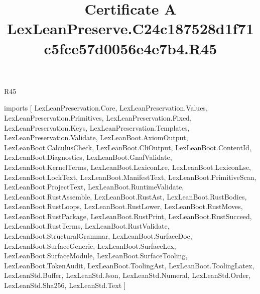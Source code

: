\begin{lexlean}{R45}
\title{Certificate A LexLeanPreserve.C24c187528d1f71c5fce57d0056e4e7b4.R45}
\begin{coremodule}
imports [
  LexLeanPreservation.Core,
  LexLeanPreservation.Values,
  LexLeanPreservation.Primitives,
  LexLeanPreservation.Fixed,
  LexLeanPreservation.Keys,
  LexLeanPreservation.Templates,
  LexLeanPreservation.Validate,
  LexLeanBoot.AxiomOutput,
  LexLeanBoot.CalculusCheck,
  LexLeanBoot.CliOutput,
  LexLeanBoot.ContentId,
  LexLeanBoot.Diagnostics,
  LexLeanBoot.GnafValidate,
  LexLeanBoot.KernelTerms,
  LexLeanBoot.LexiconLre,
  LexLeanBoot.LexiconLse,
  LexLeanBoot.LockText,
  LexLeanBoot.ManifestText,
  LexLeanBoot.PrimitiveScan,
  LexLeanBoot.ProjectText,
  LexLeanBoot.RuntimeValidate,
  LexLeanBoot.RustAssemble,
  LexLeanBoot.RustAst,
  LexLeanBoot.RustBodies,
  LexLeanBoot.RustLoops,
  LexLeanBoot.RustLower,
  LexLeanBoot.RustMoves,
  LexLeanBoot.RustPackage,
  LexLeanBoot.RustPrint,
  LexLeanBoot.RustSucceed,
  LexLeanBoot.RustTerms,
  LexLeanBoot.RustValidate,
  LexLeanBoot.StructuralGrammar,
  LexLeanBoot.SurfaceDoc,
  LexLeanBoot.SurfaceGeneric,
  LexLeanBoot.SurfaceLex,
  LexLeanBoot.SurfaceModule,
  LexLeanBoot.SurfaceTooling,
  LexLeanBoot.TokenAudit,
  LexLeanBoot.ToolingAst,
  LexLeanBoot.ToolingLatex,
  LexLeanStd.Buffer,
  LexLeanStd.Json,
  LexLeanStd.Numeral,
  LexLeanStd.Order,
  LexLeanStd.Sha256,
  LexLeanStd.Text
]


\end{coremodule}
\end{lexlean}
